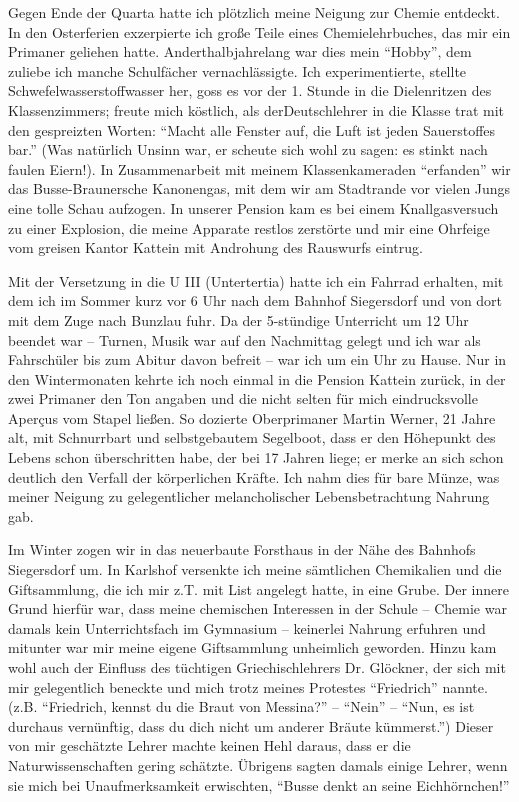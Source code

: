 Gegen Ende der Quarta hatte ich plötzlich meine Neigung zur Chemie entdeckt. In den Osterferien exzerpierte ich große Teile eines Chemielehrbuches, das mir ein Primaner geliehen hatte. Anderthalbjahrelang war dies mein \enquote{Hobby}, dem zuliebe ich manche Schulfächer vernachlässigte. Ich experimentierte, stellte Schwefelwasserstoffwasser her, goss es vor der 1. Stunde in die Dielenritzen des Klassenzimmers; freute mich köstlich, als der\linebreak Deutschlehrer in die Klasse trat mit den gespreizten Worten: \enquote{Macht alle Fenster auf, die Luft ist jeden Sauerstoffes bar.} (Was natürlich Unsinn war, er scheute sich wohl zu sagen: es stinkt nach faulen Eiern!). In Zusammenarbeit mit meinem Klassenkameraden \enquote{erfanden} wir das Busse-Braunersche Kanonengas, mit dem wir am Stadtrande vor vielen Jungs eine tolle Schau aufzogen. In unserer Pension kam es bei einem Knallgasversuch zu einer Explosion, die meine Apparate restlos zerstörte und mir eine Ohrfeige vom greisen Kantor Kattein mit Androhung des Rauswurfs eintrug.

Mit der Versetzung in die U III (Untertertia) hatte ich ein Fahrrad erhalten, mit dem ich im Sommer kurz vor 6 Uhr nach dem Bahnhof Siegersdorf und von dort mit dem Zuge nach Bunzlau fuhr. Da der 5-stündige Unterricht um 12 Uhr beendet war -- Turnen, Musik war auf den Nachmittag gelegt und ich war als Fahrschüler bis zum Abitur davon befreit -- war ich um ein Uhr zu Hause. Nur in den Wintermonaten kehrte ich noch einmal in die Pension Kattein zurück, in der zwei Primaner den Ton angaben und die nicht selten für mich eindrucksvolle Aperçus vom Stapel ließen. So dozierte Oberprimaner Martin Werner, 21 Jahre alt, mit Schnurrbart und selbstgebautem Segelboot, dass er den Höhepunkt des Lebens schon überschritten habe, der bei 17 Jahren liege; er merke an sich schon deutlich den Verfall der körperlichen Kräfte. Ich nahm dies für bare Münze, was meiner Neigung zu gelegentlicher melancholischer Lebensbetrachtung Nahrung gab.

Im Winter zogen wir in das neuerbaute Forsthaus in der Nähe des Bahnhofs Siegersdorf um. In Karlshof versenkte ich meine sämtlichen Chemikalien und die Giftsammlung, die ich mir z.T. mit List angelegt hatte, in eine Grube. Der innere Grund hierfür war, dass meine chemischen Interessen in der Schule -- Chemie war damals kein Unterrichtsfach im Gymnasium -- keinerlei Nahrung erfuhren und mitunter war mir meine eigene Giftsammlung unheimlich geworden. Hinzu kam wohl auch der Einfluss des tüchtigen Griechischlehrers Dr. Glöckner, der sich mit mir gelegentlich beneckte und mich trotz meines Protestes \enquote{Friedrich} nannte. (z.B. \enquote{Friedrich, kennst du die Braut von Messina?} -- \enquote{Nein} -- \enquote{Nun, es ist durchaus vernünftig, dass du dich nicht um anderer Bräute kümmerst.}) Dieser von mir geschätzte Lehrer machte keinen Hehl daraus, dass er die Naturwissenschaften gering schätzte. Übrigens sagten damals einige Lehrer, wenn sie mich bei Unaufmerksamkeit erwischten, \enquote{Busse denkt an seine Eichhörnchen!}

